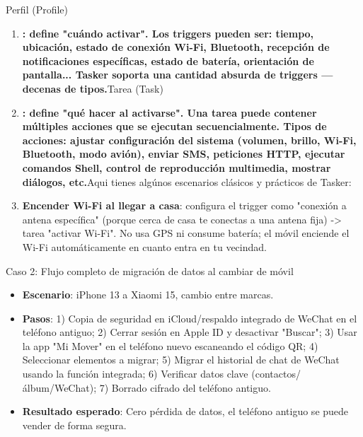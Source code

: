 \begin{tcbpractice}{Perfil (Profile)}
\begin{enumerate}
  \item \textbf{: define "cuándo activar". Los triggers pueden ser: tiempo, ubicación, estado de conexión Wi-Fi, Bluetooth, recepción de notificaciones específicas, estado de batería, orientación de pantalla... Tasker soporta una cantidad absurda de triggers — decenas de tipos.}Tarea (Task)
  \item \textbf{: define "qué hacer al activarse". Una tarea puede contener múltiples acciones que se ejecutan secuencialmente. Tipos de acciones: ajustar configuración del sistema (volumen, brillo, Wi-Fi, Bluetooth, modo avión), enviar SMS, peticiones HTTP, ejecutar comandos Shell, control de reproducción multimedia, mostrar diálogos, etc.}Aqui tienes algúnos escenarios clásicos y prácticos de Tasker:
  \item \textbf{Encender Wi-Fi al llegar a casa}: configura el trigger como "conexión a antena específica" (porque cerca de casa te conectas a una antena fija) -> tarea "activar Wi-Fi". No usa GPS ni consume batería; el móvil enciende el Wi-Fi automáticamente en cuanto entra en tu vecindad.
\end{enumerate}

\end{tcbpractice}

\begin{tcbinfo}{Caso 2: Flujo completo de migración de datos al cambiar de móvil}
\begin{itemize}
  \item \textbf{Escenario}: iPhone 13 a Xiaomi 15, cambio entre marcas.
  \item \textbf{Pasos}: 1) Copia de seguridad en iCloud/respaldo integrado de WeChat en el teléfono antiguo; 2) Cerrar sesión en Apple ID y desactivar "Buscar"; 3) Usar la app "Mi Mover" en el teléfono nuevo escaneando el código QR; 4) Seleccionar elementos a migrar; 5) Migrar el historial de chat de WeChat usando la función integrada; 6) Verificar datos clave (contactos/álbum/WeChat); 7) Borrado cifrado del teléfono antiguo.
  \item \textbf{Resultado esperado}: Cero pérdida de datos, el teléfono antiguo se puede vender de forma segura.
\end{itemize}

\end{tcbinfo}
